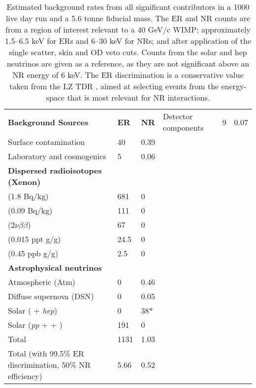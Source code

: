 \begin{table}[]
\centering
\caption{Estimated background rates from all significant contributors in a 1000 live day run and a 5.6 tonne fiducial mass. The ER and NR counts are from a region of interest relevant to a 40 GeV/c\squared{} WIMP; approximately 1.5--6.5 keV for ERs and 6--30 keV for NRs; and after application of the single scatter, skin and OD veto cuts. Counts from the solar \BE{} and hep neutrinos are given as a reference, as they are not significant above an NR energy of 6 keV. The ER discrimination is a conservative value taken from the LZ TDR \cite{lz_tdr}, aimed at selecting events from the energy-space that is most relevant for NR interactions.}
\label{tab:lz_background_count}
\vspace{1mm}
\renewcommand{\arraystretch}{1.2}
    \begin{tabularx}{1.0\linewidth}{@{\extracolsep{\fill}}lll}
    \toprule
    \textbf{Background Sources} & %
    \textbf{ER} & %
    \textbf{NR} & %
    \hline
    \hline

    Detector components                         & 9    & 0.07 \\
    Surface contamination                       & 40   & 0.39 \\
    Laboratory and cosmogenics                  & 5    & 0.06 \\
    \textbf{Dispersed radioisotopes (Xenon)}    &      &      \\
    \RnTTT{} (1.8 \micro{}Bq/kg)                & 681  & 0    \\
    \RnTTZ{} (0.09 \micro{}Bq/kg)               & 111  & 0    \\
    \XeOTS{} ($2\nu\beta\beta$)                 & 67   & 0    \\
    \KrEF{} (0.015 ppt g/g)                     & 24.5 & 0    \\
    \ArTN{} (0.45 ppb g/g)                      & 2.5  & 0    \\
    \textbf{Astrophysical neutrinos}            &      &      \\
    Atmospheric (Atm)                           & 0    & 0.46 \\
    Diffuse supernova (DSN)                     & 0    & 0.05 \\
    Solar (\BE{} + \textit{hep})                & 0    & 38*  \\
    Solar (\textit{pp} + \BeS{} + \NOT{})        & 191  & 0    \\
    \hline
    Total                                                       & 1131 & 1.03 \\
    Total (with 99.5\% ER discrimination, 50\% NR efficiency)   & 5.66 & 0.52 \\
    
    \bottomrule
    \end{tabularx}
\end{table}